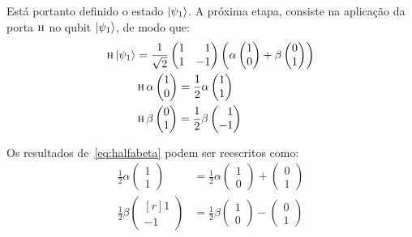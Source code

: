 Está portanto definido o estado $\ket{\psi_1}$. A próxima etapa, consiste na aplicação da porta \(\operatorname{\textsc{h}}\) no qubit $\ket{\psi_{1}}$, de modo que:
\begin{equation}\label{eq:halfabeta}
  \begin{split}
\HAD \ket{\psi_1} &= \frac{1}{\sqrt{2}} \begin{pmatrix*}[r]
1 & 1 \\
1 & -1
\end{pmatrix*} \left(\alpha \begin{pmatrix}
1 \\
0 
\end{pmatrix} + \beta \begin{pmatrix}
0 \\
1
\end{pmatrix} \right) \\
&\HAD \alpha \begin{pmatrix}
1 \\
0 
\end{pmatrix} = \frac{1}{2} \alpha \begin{pmatrix}
1 \\
1 
\end{pmatrix} \\
&\HAD \beta \begin{pmatrix}
0 \\
1
\end{pmatrix} =  \frac{1}{2} \beta \begin{pmatrix*}[r]
1 \\
-1
\end{pmatrix*}
  \end{split}
\end{equation}

Os resultados de~\eqref{eq:halfabeta} podem ser reescritos como:
\begin{equation} \label{eq:alfabetasoma}
  \begin{split}
\frac{1}{2} \alpha \begin{pmatrix}
1 \\
1 
\end{pmatrix} &= \frac{1}{2} \alpha \begin{pmatrix}
1 \\
0 
\end{pmatrix} + \begin{pmatrix}
0 \\
1 
\end{pmatrix} \\
\frac{1}{2} \beta \begin{pmatrix*}[r]
1 \\
-1
\end{pmatrix*} &= \frac{1}{2} \beta \begin{pmatrix}
1 \\
0
\end{pmatrix} - \begin{pmatrix}
0 \\
1
\end{pmatrix} 
  \end{split}
\end{equation}

